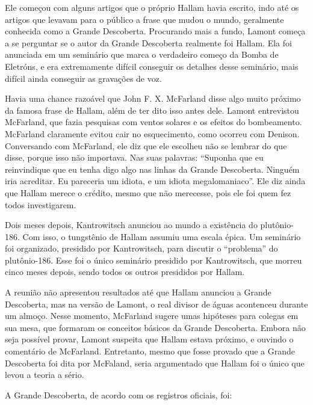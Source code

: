 \documentclass[14pt,portuguese]{extreport}
\begin{document}
    	  Ele começou com alguns artigos que o próprio Hallam havia escrito, indo até os artigos que levavam para o público a frase que mudou o mundo, geralmente conhecida como a Grande Descoberta. 
    	  Procurando mais a fundo, Lamont começa a se perguntar se o autor da Grande Descoberta realmente foi Hallam. Ela foi anunciada em um seminário que marca o verdadeiro começo da 
    	  Bomba de Eletróns, e era extremamente difícil conseguir os detalhes desse seminário, mais difícil ainda conseguir as gravações de voz. 
    	  
    	  Havia uma chance razoável que John F. X. McFarland disse algo muito próximo da famosa frase de Hallam, além de ter dito isso antes dele. 
    	  Lamont entrevistou McFarland, que fazia pesquisas com ventos solares e os efeitos do bombeamento. McFarland claramente evitou cair no esquecimento, como ocorreu com Denison. 
    	  Conversando com McFarland, ele diz que ele escolheu não se lembrar do que disse, porque isso não importava. Nas suas palavras: “Suponha que eu reinvindique que eu tenha digo algo nas linhas 
    	  da Grande Descoberta. Ninguém iria acreditar. Eu pareceria um idiota, e um idiota megalomaniaco”. Ele diz ainda que Hallam merece o crédito, mesmo que não merecesse, pois ele foi 
    	  quem fez todos investigarem.
    	  
    	  Dois meses depois, Kantrowitsch anunciou ao mundo a existência do plutônio-186. Com isso, o tungstênio de Hallam assumiu uma escala épica. 
    	  Um seminário foi organizado, presidido por Kantrowitsch, para discutir o “problema” do plutônio-186. Esse foi o único seminário presidido por Kantrowitsch, 
    	  que morreu cinco meses depois,  sendo todos os outros presididos por Hallam. 
    	  
    	  A reunião não apresentou resultados até que Hallam anunciou a Grande Descoberta, mas na versão de Lamont, o real divisor de águas acontenceu durante um almoço. 
    	  Nesse momento, McFarland sugere umas hipóteses para colegas em sua mesa, que formaram os conceitos básicos da Grande Descoberta. Embora não seja possível provar, 
    	  Lamont suspeita que Hallam estava próximo, e ouvindo o comentário de McFarland. Entretanto, mesmo que fosse provado que a Grande Descoberta foi dita por McFaland, 
    	  seria argumentado que Hallam foi o único que levou a teoria a sério. 
    	  
    	  A Grande Descoberta, de acordo com os registros oficiais, foi: 
	
\end{document}
